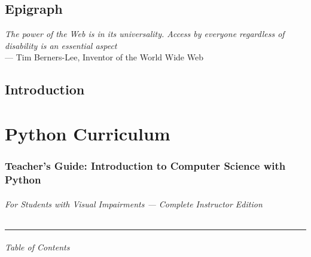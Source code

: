 \documentclass[
  justified,
  openright,
]{tufte-book}
\let\subsection\paragraph
\let\paragraph\paragraph
\let\subsection\paragraph
\let\paragraph\paragraph
\begin{document}
\chapter*{Epigraph}
\thispagestyle{empty}
\begin{flushright}
  \vspace*{0.25\textheight}
  {\itshape The power of the Web is in its universality. Access by everyone regardless of disability is an essential aspect}\\[1em]
  --- Tim Berners-Lee, Inventor of the World Wide Web
\end{flushright}
\clearpage

\newpage
\chapter*{Introduction}

\clearpage

\mainmatter
{} %
\raggedbottom
\part{Python Curriculum}

\section{Teacher's Guide: Introduction to Computer Science with
Python}\label{teachers-guide-introduction-to-computer-science-with-python}

\subsection{For Students with Visual Impairments --- Complete Instructor
Edition}\label{for-students-with-visual-impairments-complete-instructor-edition}

\begin{center}\rule{0.5\linewidth}{0.5pt}\end{center}

\subsection{Table of Contents}\label{table-of-contents}
\end{document}
